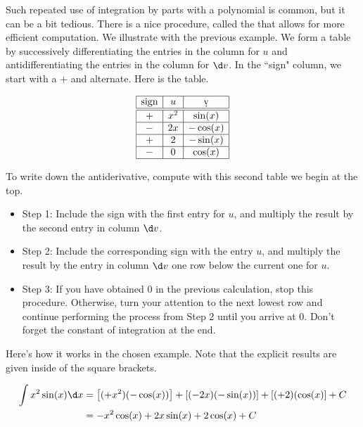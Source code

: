 \documentclass{ximera}
\begin{document}
\begin{remark}
Such repeated use of integration by parts with a polynomial is common, but 
it can be a bit tedious. There is a nice procedure, called the  that allows for more efficient computation.  We illustrate with the 
previous example.  We form a table by successively differentiating the entries 
in the column for $u$ and antidifferentiating the entries in the column for $\d v$.  
In the ``sign" column, we start with a $+$ and alternate.  Here is the table.

\[
\begin{array}{|c|c|c|}\hline
\text{sign} & u & \d v \\ \hline \hline
+ & x^2 & \sin(x) \\ \hline
- & 2x & -\cos(x) \\ \hline
 + & 2  & -\sin(x) \\ \hline
- & 0  & \cos(x) \\ \hline
\end{array}
\]

To write down the antiderivative, compute with this second table we begin at the top. 

\begin{itemize}
\item Step 1: Include the sign with the first entry for $u$, and multiply the result by the second entry in column $\d v$.  
\item Step 2: Include the corresponding sign with the entry $u$, and multiply the result by the entry in column $\d v$ one row below the current one for $u$.  
\item Step 3: If you have obtained 0 in the previous calculation, stop this procedure. Otherwise, turn your attention to the next lowest row and continue performing the process from Step 2 until you arrive at 0.  Don't forget the constant of integration at the end.
\end{itemize}

Here's how it works in the chosen example.  Note that the explicit results are given inside of the square brackets.

\begin{align*}
\int x^2 \sin(x) \d x &= \left[(+x^2)(-\cos(x))\right] + \left[(-2x)(-\sin(x)) \right] +\left[(+2)(\cos(x)\right] + C\\
&= -x^2 \cos(x) +2x\sin(x)+2\cos(x) +C
\end{align*}

\end{remark}
\end{document}
